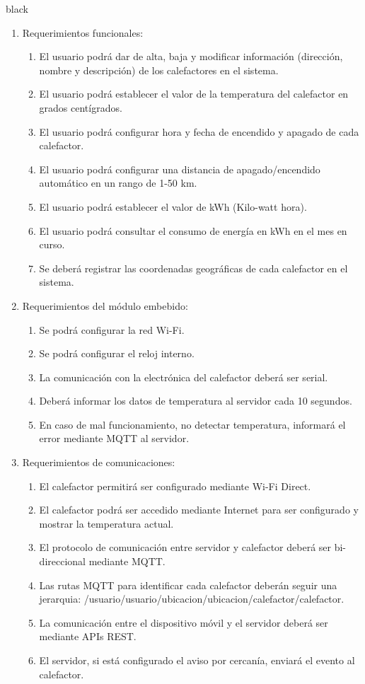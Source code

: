 \documentclass[
11pt, %
codirector, %
]{charter}
\begin{document}
\begin{consigna}{black}

\begin{enumerate}
	\item Requerimientos funcionales:
		\begin{enumerate}
			\item El usuario podrá dar de alta, baja y modificar información (dirección, nombre y descripción) de los  calefactores en el sistema.
			
			\item El usuario podrá establecer el valor de la temperatura del calefactor en grados centígrados.
			\item El usuario podrá configurar hora y fecha de encendido y apagado de cada calefactor.
			\item El usuario podrá configurar una distancia de apagado/encendido automático en un rango de 1-50 km.
			\item El usuario podrá establecer el valor de kWh (Kilo-watt hora).
			\item El usuario podrá consultar el consumo de energía en kWh en el mes en curso.
			\item Se deberá registrar las coordenadas geográficas de cada calefactor en el sistema.
		\end{enumerate}
	\item Requerimientos del  módulo embebido:
		\begin{enumerate}
			\item Se podrá configurar la red Wi-Fi.
			\item Se podrá configurar el reloj interno.
			\item La comunicación con la electrónica del calefactor deberá ser serial.
			\item Deberá informar los datos de temperatura al servidor cada 10 segundos.
			\item En caso de mal funcionamiento, no detectar temperatura, informará el error mediante MQTT al servidor.
		\end{enumerate}
	\item Requerimientos de comunicaciones:
		\begin{enumerate}
			\item El calefactor permitirá ser configurado mediante Wi-Fi Direct.
			\item El calefactor podrá ser accedido mediante Internet para ser configurado y mostrar la temperatura actual.
			\item El protocolo de comunicación entre servidor y calefactor deberá ser bi-direccional mediante MQTT.
			\item Las rutas MQTT para identificar cada calefactor deberán seguir una jerarquia: /usuario/{usuario}/ubicacion/{ubicacion}/calefactor/{calefactor}.
			\item La comunicación entre el dispositivo móvil y el servidor deberá ser mediante APIs REST.
			\item El servidor, si está configurado el aviso por cercanía, enviará el evento al calefactor.
		\end{enumerate}
	

\end{enumerate}
\end{consigna}
\end{document}
